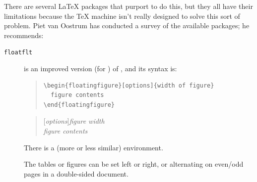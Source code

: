 
There are several \LaTeX{} packages that purport to do this, but they
all have their limitations because the \TeX{} machine isn't really
designed to solve this sort of problem.  Piet van Oostrum has
conducted a survey of the available packages; he recommends:
\begin{description}
\item[\texttt{floatflt}]  is an improved version
  (for \LaTeXe{}) of , and its syntax is:
\begin{wideversion}
\begin{quote}
\begin{verbatim}
\begin{floatingfigure}[options]{width of figure}
  figure contents
\end{floatingfigure}
\end{verbatim}
\end{quote}
\end{wideversion}
\begin{narrowversion}
  \begin{quote}
    [\emph{options}]{\emph{figure width}}\\
    \mbox{}\qquad\emph{figure contents}\\
  \end{quote}
\end{narrowversion}
There is a (more or less similar) 
environment.

The tables or figures can be set left or right, or alternating on
even/odd pages in a double-sided document.


\end{description}
